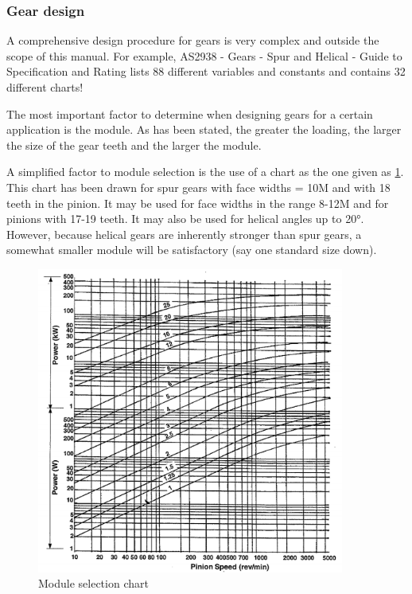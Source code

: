 \subsubsection{Gear design}

A comprehensive design procedure for gears is very complex and outside the scope of this manual. For example, AS2938 - Gears - Spur and Helical - Guide to Specification and Rating lists 88 different variables and constants and contains 32 different charts!

The most important factor to determine when designing gears for a certain application is the module. As has been stated, the greater the loading, the larger the size of the gear teeth and the larger the module.

A simplified factor to module selection is the use of a chart as the one given as \cref{fig-8}. This chart has been drawn for spur gears with face widths = 10M and with 18 teeth in the pinion. It may be used for face widths in the range 8-12M and for pinions with 17-19 teeth. It may also be used for helical angles up to \ang{20}. However, because helical gears are inherently stronger than spur gears, a somewhat smaller module will be satisfactory (say one standard size down).

\begin{figure}[th!]
  \center
  \includegraphics[width=0.9\textwidth]{figs/fig8.png}
  \caption{Module selection chart}
  \label{fig-8}
\end{figure}

